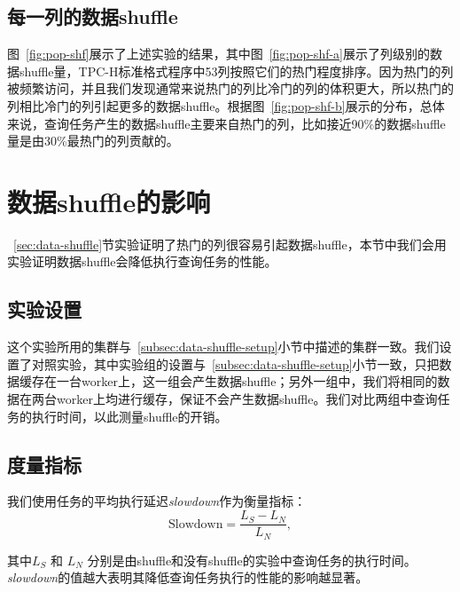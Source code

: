 \subsection{每一列的数据shuffle}

\par 图~\ref{fig:pop-shf}展示了上述实验的结果，其中图~\ref{fig:pop-shf-a}展示了列级别的数据shuffle量，TPC-H标准格式程序中53列按照它们的热门程度排序。因为热门的列被频繁访问，并且我们发现通常来说热门的列比冷门的列的体积更大，所以热门的列相比冷门的列引起更多的数据shuffle。根据图~\ref{fig:pop-shf-b}展示的分布，总体来说，查询任务产生的数据shuffle主要来自热门的列，比如接近90\%的数据shuffle量是由30\%最热门的列贡献的。

\section{数据shuffle的影响}
\label{sec:shuffle-impact}

\par ~\ref{sec:data-shuffle}节实验证明了热门的列很容易引起数据shuffle，本节中我们会用实验证明数据shuffle会降低执行查询任务的性能。

\subsection{实验设置}
\label{subsec:shuffle-impact-setup}

\par 这个实验所用的集群与~\ref{subsec:data-shuffle-setup}小节中描述的集群一致。我们设置了对照实验，其中实验组的设置与~\ref{subsec:data-shuffle-setup}小节一致，只把数据缓存在一台worker上，这一组会产生数据shuffle；另外一组中，我们将相同的数据在两台worker上均进行缓存，保证不会产生数据shuffle。我们对比两组中查询任务的执行时间，以此测量shuffle的开销。

\subsection{度量指标}
\label{subsec:shuffle-impact-metrics}

\par 我们使用任务的平均执行延迟\emph{slowdown}作为衡量指标：
\begin{equation}
    \text{Slowdown} = \frac{L_S - L_N}{L_N},
\end{equation}

\par 其中$L_S$ 和 $L_N$ 分别是由shuffle和没有shuffle的实验中查询任务的执行时间。\emph{slowdown}的值越大表明其降低查询任务执行的性能的影响越显著。

